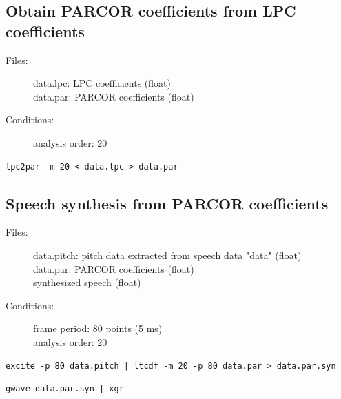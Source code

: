 \documentclass[a4paper,10pt]{article}
\begin{document}
\subsection{Obtain PARCOR coefficients from LPC coefficients}

\begin{description}
\item[Files:] 
   data.lpc: LPC coefficients (float)\\
   data.par: PARCOR coefficients (float)
\item[Conditions:]
  analysis order: 20
\end{description}

\begin{verbatim}
lpc2par -m 20 < data.lpc > data.par
\end{verbatim}

\subsection{Speech synthesis from PARCOR coefficients}
\begin{description}
\item[Files:]
  data.pitch: pitch data extracted from speech data "data" (float)\\
  data.par: PARCOR coefficients (float)\\
  synthesized speech (float)
\item[Conditions:]
  frame period: 80 points (5 ms)\\
  analysis order: 20
\end{description}

\begin{verbatim}
excite -p 80 data.pitch | ltcdf -m 20 -p 80 data.par > data.par.syn
\end{verbatim}

\begin{verbatim}
gwave data.par.syn | xgr
\end{verbatim}
\end{document}
